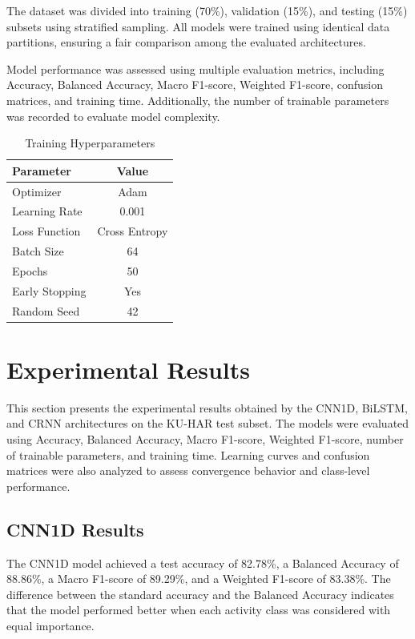 \documentclass[journal]{IEEEtran}
\begin{document}
The dataset was divided into training (70\%), validation (15\%), and testing (15\%) subsets using stratified sampling. All models were trained using identical data partitions, ensuring a fair comparison among the evaluated architectures.

Model performance was assessed using multiple evaluation metrics, including Accuracy, Balanced Accuracy, Macro F1-score, Weighted F1-score, confusion matrices, and training time. Additionally, the number of trainable parameters was recorded to evaluate model complexity.


\begin{table}[!t]
\caption{Training Hyperparameters}
\label{tab:hyperparameters}
\centering
\begin{tabular}{lc}
\hline
Parameter & Value\\
\hline
Optimizer & Adam\\
Learning Rate & 0.001\\
Loss Function & Cross Entropy\\
Batch Size & 64\\
Epochs & 50\\
Early Stopping & Yes\\
Random Seed & 42\\
\hline
\end{tabular}
\end{table}


\section{Experimental Results}

This section presents the experimental results obtained by the CNN1D, BiLSTM, and CRNN architectures on the KU-HAR test subset. The models were evaluated using Accuracy, Balanced Accuracy, Macro F1-score, Weighted F1-score, number of trainable parameters, and training time. Learning curves and confusion matrices were also analyzed to assess convergence behavior and class-level performance.

\subsection{CNN1D Results}

The CNN1D model achieved a test accuracy of 82.78\%, a Balanced Accuracy of 88.86\%, a Macro F1-score of 89.29\%, and a Weighted F1-score of 83.38\%. The difference between the standard accuracy and the Balanced Accuracy indicates that the model performed better when each activity class was considered with equal importance.
\end{document}
